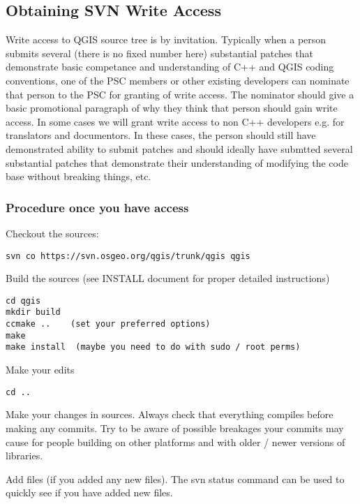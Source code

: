 \hypertarget{toc45}{}
\subsection{Obtaining SVN Write Access}
Write access to QGIS source tree is by invitation. Typically when a person
submits several (there is no fixed number here) substantial patches that
demonstrate basic competance and understanding of C++ and QGIS coding
conventions, one of the PSC members or other existing developers can nominate
that person to the PSC for granting of write access. The nominator should give
a basic promotional paragraph of why they think that person should gain write
access. In some cases we will grant write access to non C++ developers e.g. for
translators and documentors.  In these cases, the person should still have
demonstrated ability to submit patches and should ideally have submtted several
substantial patches that demonstrate their understanding of modifying the code
base without breaking things, etc.

\hypertarget{toc46}{}
\subsubsection{Procedure once you have access}
Checkout the sources:

\begin{verbatim}
svn co https://svn.osgeo.org/qgis/trunk/qgis qgis
\end{verbatim}

Build the sources (see INSTALL document for proper detailed instructions)

\begin{verbatim}
cd qgis
mkdir build
ccmake ..    (set your preferred options)
make
make install  (maybe you need to do with sudo / root perms)
\end{verbatim}

Make your edits

\begin{verbatim}
cd ..
\end{verbatim}

Make your changes in sources. Always check that everything compiles before
making any commits.  Try to be aware of possible breakages your commits may
cause for people building on other platforms and with older / newer versions of
libraries.

Add files (if you added any new files). The svn status command can be used to
quickly see if you have added new files.

